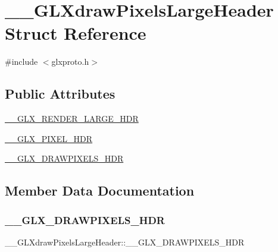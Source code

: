 \hypertarget{struct_____g_l_xdraw_pixels_large_header}{}\section{\+\_\+\+\_\+\+G\+L\+Xdraw\+Pixels\+Large\+Header Struct Reference}
\label{struct_____g_l_xdraw_pixels_large_header}


{\ttfamily \#include $<$glxproto.\+h$>$}

\subsection*{Public Attributes}
\begin{DoxyCompactItemize}
\item 
\hyperlink{struct_____g_l_xdraw_pixels_large_header_a4d7faf5137408f33ce6ac04b829e69d3}{\+\_\+\+\_\+\+G\+L\+X\+\_\+\+R\+E\+N\+D\+E\+R\+\_\+\+L\+A\+R\+G\+E\+\_\+\+H\+DR}
\item 
\hyperlink{struct_____g_l_xdraw_pixels_large_header_af13a52715e2785997b53214ed3bf3ed7}{\+\_\+\+\_\+\+G\+L\+X\+\_\+\+P\+I\+X\+E\+L\+\_\+\+H\+DR}
\item 
\hyperlink{struct_____g_l_xdraw_pixels_large_header_ab37c1cc0f8921864df0613eea7056de3}{\+\_\+\+\_\+\+G\+L\+X\+\_\+\+D\+R\+A\+W\+P\+I\+X\+E\+L\+S\+\_\+\+H\+DR}
\end{DoxyCompactItemize}


\subsection{Member Data Documentation}
\mbox{\label{struct_____g_l_xdraw_pixels_large_header_ab37c1cc0f8921864df0613eea7056de3}} 
\subsubsection{\texorpdfstring{\+\_\+\+\_\+\+G\+L\+X\+\_\+\+D\+R\+A\+W\+P\+I\+X\+E\+L\+S\+\_\+\+H\+DR}{\_\_GLX\_DRAWPIXELS\_HDR}}
{\footnotesize\ttfamily \+\_\+\+\_\+\+G\+L\+Xdraw\+Pixels\+Large\+Header\+::\+\_\+\+\_\+\+G\+L\+X\+\_\+\+D\+R\+A\+W\+P\+I\+X\+E\+L\+S\+\_\+\+H\+DR}

